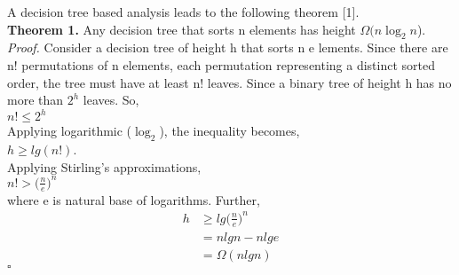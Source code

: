 \documentclass[a4paper, 10pt,twocolumn]{article}
\newcommand{\qed}{$\square$}
\begin{document}
A decision tree based analysis leads to the following theorem [1].
\vspace{2mm}\\
\textbf{Theorem 1.} Any decision tree that sorts n elements has height $\Omega(n \log_{2}n$).
\vspace{2mm}\\
\textit{Proof.}
Consider a decision tree of height h that sorts n e lements. Since there are n! permutations of n elements, each permutation representing a distinct sorted order, the tree must have at least n! leaves. Since a binary tree of height h has no more than $2^h$ leaves. So,
\vspace{2mm}\\
$n! \leq 2^h$
\vspace{2mm}\\
Applying logarithmic ($\log_{2}$), the inequality becomes,
\vspace{2mm}\\
$h\geq lg(n!)$.
\vspace{2mm}\\
Applying Stirling’s approximations,
\vspace{2mm}\\
$n! > \bigg(\frac{n}{e}\bigg)^{n}$
\vspace{2mm}\\
where e is natural base of logarithms. Further,
\vspace{2mm}\\
\begin{equation*}
    \begin{split}
        h &\geq lg\bigg(\frac{n}{e}\bigg)^{n}\\
          &= n lg n - n lg e\\
          &= \Omega(n lg n)
    \end{split}
\end{equation*}
\null\hfill\qed
\end{document}
